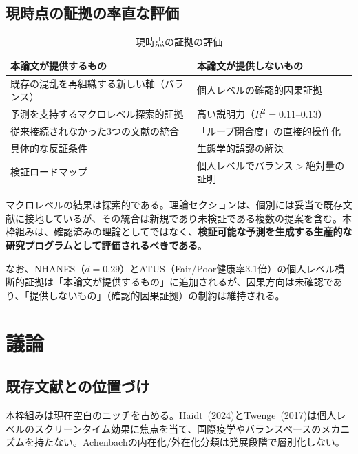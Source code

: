 \documentclass[a4paper,11pt,titlepage]{article}
\begin{document}
\subsection{現時点の証拠の率直な評価}

\begin{table}[htbp]
\centering
\caption{現時点の証拠の評価}
\label{tab:honest}
\begin{tabular}{p{6.5cm}p{6.5cm}}
\toprule
本論文が提供するもの & 本論文が提供しないもの \\
\midrule
既存の混乱を再組織する新しい軸（バランス） & 個人レベルの確認的因果証拠 \\
予測を支持するマクロレベル探索的証拠 & 高い説明力（$R^2 = 0.11$--$0.13$） \\
従来接続されなかった3つの文献の統合 & 「ループ閉合度」の直接的操作化 \\
具体的な反証条件 & 生態学的誤謬の解決 \\
検証ロードマップ & 個人レベルでバランス$>$絶対量の証明 \\
\bottomrule
\end{tabular}
\end{table}

マクロレベルの結果は探索的である。理論セクションは、個別には妥当で既存文献に接地しているが、その統合は新規であり未検証である複数の提案を含む。本枠組みは、確認済みの理論としてではなく、\textbf{検証可能な予測を生成する生産的な研究プログラムとして評価されるべきである}。

なお、NHANES（$d = 0.29$）とATUS（Fair/Poor健康率3.1倍）の個人レベル横断的証拠は「本論文が提供するもの」に追加されるが、因果方向は未確認であり、「提供しないもの」（確認的因果証拠）の制約は維持される。


\section{議論}\label{sec:discussion}

\subsection{既存文献との位置づけ}

本枠組みは現在空白のニッチを占める。Haidt~(2024)とTwenge~(2017)は個人レベルのスクリーンタイム効果に焦点を当て、国際疫学やバランスベースのメカニズムを持たない。Achenbachの内在化/外在化分類は発展段階で層別化しない。
\end{document}
